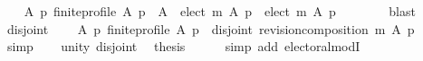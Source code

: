 \begin{isabellebody}
\ \ \isamarkupfalse%
\ {\isachardoublequoteopen}{\isasymforall}A\ p{\isachardot}{\kern0pt}\ finite{\isacharunderscore}{\kern0pt}profile\ A\ p\ {\isasymlongrightarrow}\ {\isacharparenleft}{\kern0pt}A\ {\isacharminus}{\kern0pt}\ elect\ m\ A\ p{\isacharparenright}{\kern0pt}\ {\isasyminter}\ elect\ m\ A\ p\ {\isacharequal}{\kern0pt}\ {\isacharbraceleft}{\kern0pt}{\isacharbraceright}{\kern0pt}{\isachardoublequoteclose}\isanewline
\ \ \ \ \isamarkupfalse%
\ blast\isanewline
\ \ \isamarkupfalse%
\ disjoint{\isacharcolon}{\kern0pt}\isanewline
\ \ \ \ {\isachardoublequoteopen}{\isasymforall}A\ p{\isachardot}{\kern0pt}\ finite{\isacharunderscore}{\kern0pt}profile\ A\ p\ {\isasymlongrightarrow}\ disjoint{}\ {\isacharparenleft}{\kern0pt}revision{\isacharunderscore}{\kern0pt}composition\ m\ A\ p{\isacharparenright}{\kern0pt}{\isachardoublequoteclose}\isanewline
\ \ \ \ \isamarkupfalse%
\ simp\isanewline
\ \ \isamarkupfalse%
\ unity\ disjoint\ \isamarkupfalse%
\ {\isacharquery}{\kern0pt}thesis\isanewline
\ \ \ \ \isamarkupfalse%
\ {\isacharparenleft}{\kern0pt}simp\ add{\isacharcolon}{\kern0pt}\ electoral{\isacharunderscore}{\kern0pt}modI{\isacharparenright}{\kern0pt}\isanewline
{}\isamarkupfalse%
%
\endisatagproof
{\isafoldproof}%
%
\isadelimproof
%
\endisadelimproof
%
\isadelimdocument
%
\endisadelimdocument
%
\isatagdocument
%
\isamarkuptrue%
%
\endisatagdocument
{\isafolddocument}%
%
\isadelimdocument
%
\endisadelimdocument
%
\isadelimtheory
%
\endisadelimtheory
%
\isatagtheory
{}\isamarkupfalse%
%
\endisatagtheory
{\isafoldtheory}%
%
\isadelimtheory
%
\endisadelimtheory
%
\end{isabellebody}%
\endinput
